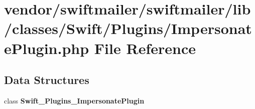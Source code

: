 \section{vendor/swiftmailer/swiftmailer/lib/classes/\+Swift/\+Plugins/\+Impersonate\+Plugin.php File Reference}
\label{_impersonate_plugin_8php}
\subsection*{Data Structures}
\begin{DoxyCompactItemize}
\item 
class {\bf Swift\+\_\+\+Plugins\+\_\+\+Impersonate\+Plugin}
\end{DoxyCompactItemize}
